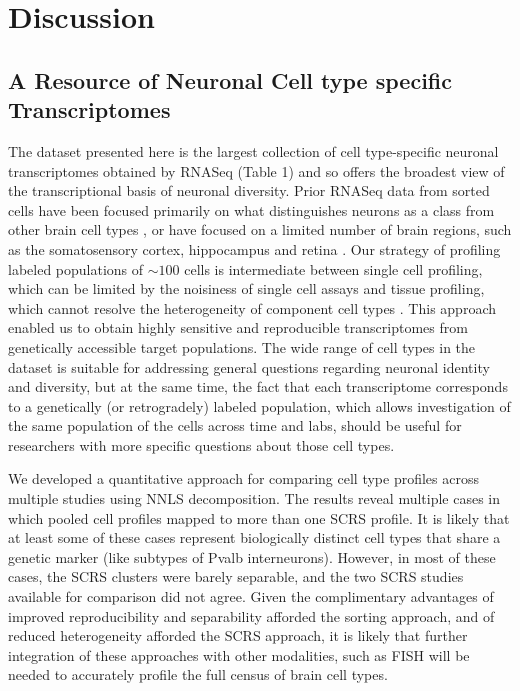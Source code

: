 
\section{Discussion}

\subsection{A Resource of Neuronal Cell type specific Transcriptomes}
The dataset presented here is the largest collection of cell type-specific neuronal transcriptomes obtained by RNASeq (Table 1) and so offers the broadest view of the transcriptional basis of neuronal diversity. Prior RNASeq data from sorted cells have been focused primarily on what distinguishes neurons as a class from other brain cell types \cite{Zhang_2014}, or have focused on a limited number of brain regions, such as the somatosensory cortex, hippocampus  \cite{Zeisel_2015} and retina \cite{Macosko_2015}. Our strategy of profiling labeled populations of $\sim100$ cells is intermediate between single cell profiling, which can be limited by the noisiness of single cell assays \cite{Marinov_2013} and tissue profiling, which cannot resolve the heterogeneity of component cell types \cite{Nelson_2006}. This approach enabled us to obtain highly sensitive and reproducible transcriptomes from genetically accessible target populations. The wide range of cell types in the dataset is suitable for addressing general questions regarding neuronal identity and diversity, but at the same time, the fact that each transcriptome corresponds to a genetically (or retrogradely) labeled population, which allows investigation of the same population of the cells across time and labs, should be useful for researchers with more specific questions about those cell types.

We developed a quantitative approach for comparing cell type profiles across multiple studies using NNLS decomposition. The results reveal multiple cases in which pooled cell profiles mapped to more than one SCRS profile. It is likely that at least some of these cases represent biologically distinct cell types that share a genetic marker (like subtypes of Pvalb interneurons). However, in most of these cases, the SCRS clusters were barely separable, and the two SCRS studies available for comparison did not agree. Given the complimentary advantages of improved reproducibility and separability afforded the sorting approach, and of reduced heterogeneity afforded the SCRS approach, it is likely that further integration of these approaches with other modalities, such as FISH \cite{Moffitt_2016} will be needed to accurately profile the full census of brain cell types. 

